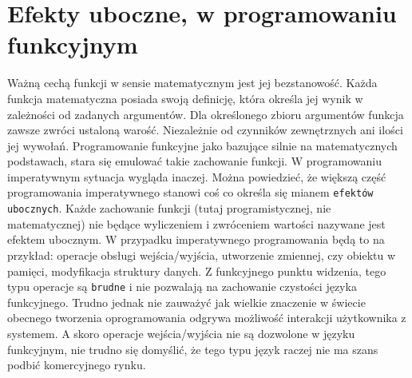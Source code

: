 \documentclass[a4paper,10pt]{report}
\begin{document}
\section{Efekty uboczne, w programowaniu funkcyjnym}
Ważną cechą funkcji w sensie matematycznym jest jej bezstanowość. Każda funkcja matematyczna posiada swoją definicję, która określa jej wynik w zależności od zadanych argumentów. Dla określonego zbioru argumentów funkcja zawsze zwróci ustaloną warość. Niezależnie od czynników zewnętrznych ani ilości jej wywołań. Programowanie funkcyjne jako bazujące silnie na matematycznych podstawach, stara się emulować takie zachowanie funkcji. W programowaniu imperatywnym sytuacja wygląda inaczej. Można powiedzieć, że większą część programowania imperatywnego stanowi coś co określa się mianem \verb|efektów ubocznych|. Każde zachowanie funkcji (tutaj programistycznej, nie matematycznej) nie będące wyliczeniem i zwróceniem wartości nazywane jest efektem ubocznym. W przypadku imperatywnego programowania będą to na przykład: operacje obsługi wejścia/wyjścia, utworzenie zmiennej, czy obiektu w pamięci, modyfikacja struktury danych. Z funkcyjnego punktu widzenia, tego typu operacje są \verb|brudne| i nie pozwalają na zachowanie czystości języka funkcyjnego. Trudno jednak nie zauważyć jak wielkie znaczenie w świecie obecnego tworzenia oprogramowania odgrywa możliwość interakcji użytkownika z systemem. A skoro operacje wejścia/wyjścia nie są dozwolone w języku funkcyjnym, nie trudno się domyślić, że tego typu język raczej nie ma szans podbić komercyjnego rynku.
\end{document}
